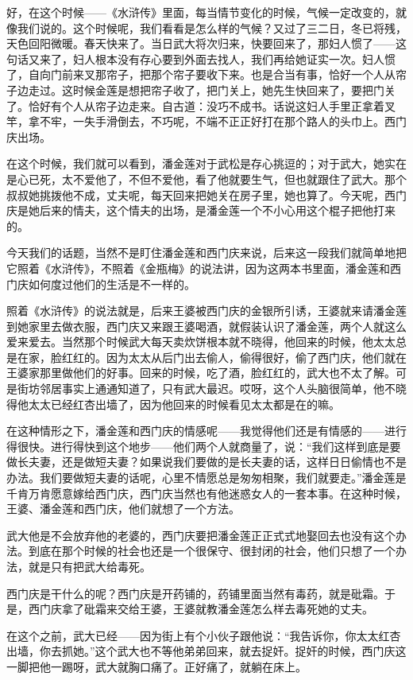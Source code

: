 \par 好，在这个时候——《水浒传》里面，每当情节变化的时候，气候一定改变的，就像我们说的。这个时候呢，我们看看是怎么样的气候？又过了三二日，冬已将残，天色回阳微暖。春天快来了。当日武大将次归来，快要回来了，那妇人惯了——这句话又来了，妇人根本没有存心要到外面去找人，我们再给她证实一次。妇人惯了，自向门前来叉那帘子，把那个帘子要收下来。也是合当有事，恰好一个人从帘子边走过。这时候金莲是想把帘子收了，把门关上，她先生快回来了，要把门关了。恰好有个人从帘子边走来。自古道：没巧不成书。话说这妇人手里正拿着叉竿，拿不牢，一失手滑倒去，不巧呢，不端不正正好打在那个路人的头巾上。西门庆出场。
\par 在这个时候，我们就可以看到，潘金莲对于武松是存心挑逗的；对于武大，她实在是心已死，太不爱他了，不但不爱他，看了他就要生气，但也就跟住了武大。那个叔叔她挑拨他不成，丈夫呢，每天回来把她关在房子里，她也算了。今天呢，西门庆是她后来的情夫，这个情夫的出场，是潘金莲一个不小心用这个棍子把他打来的。
\par 今天我们的话题，当然不是盯住潘金莲和西门庆来说，后来这一段我们就简单地把它照着《水浒传》，不照着《金瓶梅》的说法讲，因为这两本书里面，潘金莲和西门庆如何度过他们的生活是不一样的。
\par 照着《水浒传》的说法就是，后来王婆被西门庆的金银所引诱，王婆就来请潘金莲到她家里去做衣服，西门庆又来跟王婆喝酒，就假装认识了潘金莲，两个人就这么爱来爱去。当然那个时候武大每天卖炊饼根本就不晓得，他回来的时候，他太太总是在家，脸红红的。因为太太从后门出去偷人，偷得很好，偷了西门庆，他们就在王婆家那里做他们的好事。回来的时候，吃了酒，脸红红的，武大也不太了解。可是街坊邻居事实上通通知道了，只有武大最迟。哎呀，这个人头脑很简单，他不晓得他太太已经红杏出墙了，因为他回来的时候看见太太都是在的嘛。
\par 在这种情形之下，潘金莲和西门庆的情感呢——我觉得他们还是有情感的——进行得很快。进行得快到这个地步——他们两个人就商量了，说：“我们这样到底是要做长夫妻，还是做短夫妻？如果说我们要做的是长夫妻的话，这样日日偷情也不是办法。我们要做短夫妻的话呢，心里不情愿总是匆匆相聚，我们就要走。”潘金莲是千肯万肯愿意嫁给西门庆，西门庆当然也有他迷惑女人的一套本事。在这种时候，王婆、潘金莲和西门庆，他们就想了一个方法。
\par 武大他是不会放弃他的老婆的，西门庆要把潘金莲正正式式地娶回去也没有这个办法。到底在那个时候的社会也还是一个很保守、很封闭的社会，他们只想了一个办法，就是只有把武大给毒死。
\par 西门庆是干什么的呢？西门庆是开药铺的，药铺里面当然有毒药，就是砒霜。于是，西门庆拿了砒霜来交给王婆，王婆就教潘金莲怎么样去毒死她的丈夫。
\par 在这个之前，武大已经——因为街上有个小伙子跟他说：“我告诉你，你太太红杏出墙，你去抓她。”这个武大也不等他弟弟回来，就去捉奸。捉奸的时候，西门庆这一脚把他一踢呀，武大就胸口痛了。正好痛了，就躺在床上。
